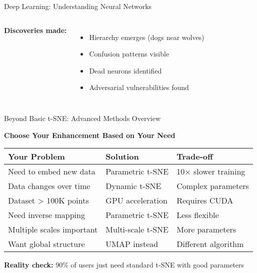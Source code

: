 \documentclass[aspectratio=169]{beamer}
\begin{document}
\begin{frame}{Deep Learning: Understanding Neural Networks}
\begin{columns}
\textbf{Discoveries made:}
\begin{itemize}
\item Hierarchy emerges (dogs near wolves)
\item Confusion patterns visible
\item Dead neurons identified
\item Adversarial vulnerabilities found
\end{itemize}
\end{columns}
\end{frame}



\begin{frame}{Beyond Basic t-SNE: Advanced Methods Overview}
\begin{center}
\textbf{Choose Your Enhancement Based on Your Need}
\end{center}

\vspace{3mm}
\begin{tabular}{l|l|l}
\textbf{Your Problem} & \textbf{Solution} & \textbf{Trade-off} \\
\hline
Need to embed new data & Parametric t-SNE & 10× slower training \\
Data changes over time & Dynamic t-SNE & Complex parameters \\
Dataset > 100K points & GPU acceleration & Requires CUDA \\
Need inverse mapping & Parametric t-SNE & Less flexible \\
Multiple scales important & Multi-scale t-SNE & More parameters \\
Want global structure & UMAP instead & Different algorithm \\
\end{tabular}

\vspace{5mm}
\begin{center}
\colorbox{yellow!20}{\parbox{0.85\textwidth}{\centering
\textbf{Reality check:} 90\% of users just need standard t-SNE with good parameters}}
\end{center}
\end{frame}
\end{document}
